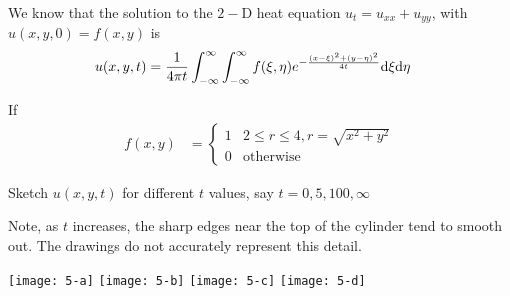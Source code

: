 \item We know that the solution to the $2-$D heat equation
$u_t = u_{xx} + u_{yy}$, with $u(x, y, 0) = f(x, y)$ is
%
\begin{align}
  u(x, y, t)
  & = \frac{1}{4 \pi t} \int^\infty_{-\infty} \int^\infty_{-\infty}
  f(\xi, \eta) e^{-\frac{(x - \xi)^2 + (y - \eta)^2}{4t}} \text d\xi \text d\eta
\end{align}

If
%
\begin{align}
  f(x, y) & =
  \begin{cases}
    1 & 2 \leq r \leq 4, r = \sqrt{x^2 + y^2}\\
    0 & \text{otherwise}
  \end{cases}
\end{align}

Sketch $u(x, y, t)$ for different $t$ values, say $t = 0, 5, 100, \infty$
\bigbreak

Note, as $t$ increases, the sharp edges near the top of the cylinder tend to smooth out. The drawings do not accurately represent this detail.

\begin{center}
  \texttt{[image: 5-a]}
  \texttt{[image: 5-b]}
  \texttt{[image: 5-c]}
  \texttt{[image: 5-d]}
\end{center}
